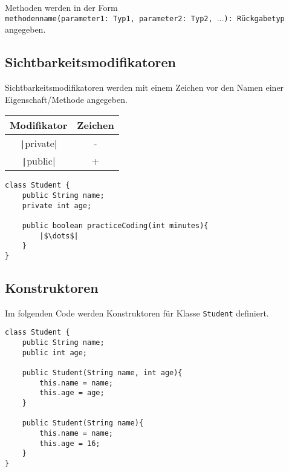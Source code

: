 \documentclass[a4paper]{scrartcl}
\begin{document}
\noindent
Methoden werden in der Form \\ \texttt{methodenname(parameter1: Typ1, parameter2: Typ2, $\dots$): Rückgabetyp}\\ angegeben.



\subsection*{Sichtbarkeitsmodifikatoren}

Sichtbarkeitsmodifikatoren werden mit einem Zeichen vor den Namen einer Eigenschaft/Methode angegeben.

\begin{center}
\begin{tabular}{cc}
\hline
Modifikator & Zeichen  \\
\hline
\texttt|private| & -  \\
\texttt|public| & +  \\
\hline
\end{tabular}

\end{center}

\begin{verbatim}
class Student {
    public String name;
    private int age;
	   
    public boolean practiceCoding(int minutes){
	    |$\dots$|
    }
}
\end{verbatim}


\begin{center}
\end{center}


\subsection*{Konstruktoren}

Im folgenden Code werden Konstruktoren für Klasse \texttt{Student} definiert.

\begin{verbatim}
class Student {
    public String name;
    public int age;

    public Student(String name, int age){
        this.name = name;
        this.age = age;
    }

    public Student(String name){
        this.name = name;
        this.age = 16;
    }
}
\end{verbatim}
\end{document}
